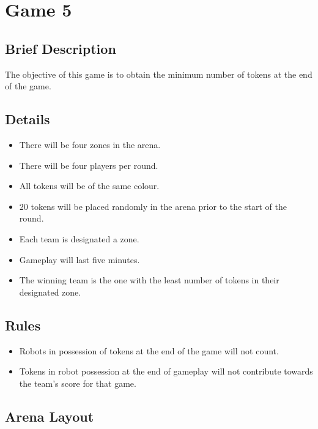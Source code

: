 \section {Game 5}

\subsection {Brief Description}

The objective of this game is to obtain the minimum number of tokens at the end of the game.

\subsection {Details}

\begin {itemize}

\item There will be four zones in the arena.
\item There will be four players per round.
\item All tokens will be of the same colour.
\item 20 tokens will be placed randomly in the arena prior to the start of the round.
\item Each team is designated a zone. 
\item Gameplay will last five minutes.
\item The winning team is the one with the least number of tokens in their designated zone.

\end {itemize}

\subsection {Rules}

\begin {itemize}
\item Robots in possession of tokens at the end of the game will not count.
\item Tokens in robot possession at the end of gameplay will not contribute towards the team's score for that game.
\end {itemize}

\clearpage
\newpage

\subsection {Arena Layout}

